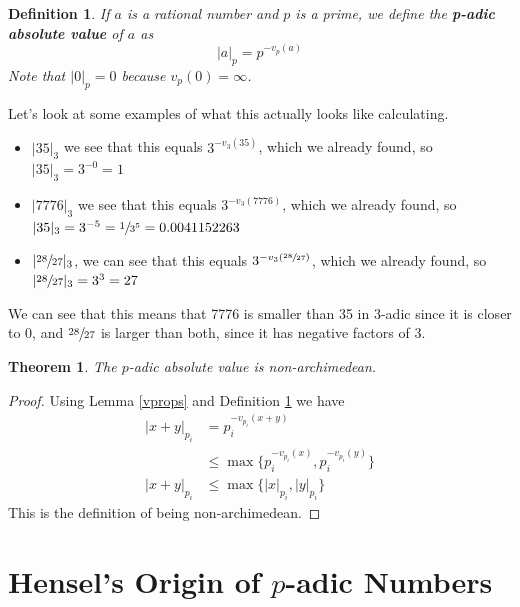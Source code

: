 \documentclass[11pt]{article}
\newtheorem{theorem}{Theorem}[section]
\newtheorem{definition}{Definition}[section]
\newcommand{\padic}{$p$-adic }
\newcommand{\bpadic}{p-adic }
\begin{document}
\begin{definition}\label{pabs}
  If $a$ is a rational number and $p$ is a prime, we define the \textbf{\bpadic absolute value} of $a$ as
  \[
    |a|_p = p^{-v_p(a)}
  \]
  Note that $|0|_p=0$ because $v_p(0)=\infty$.
\end{definition}

Let's look at some examples of what this actually looks like calculating.
\begin{itemize}
  \item $|35|_3$ we see that this equals $3^{-v_3(35)}$, which we already found, so $|35|_3=3^{-0}=1$
  \item $|7776|_3$ we see that this equals $3^{-v_3(7776)}$, which we already found, so $|35|_3=3^{-5}=\sfrac{1}{3^5}=0.0041152263$
  \item $|\sfrac{28}{27}|_3$, we can see that this equals $3^{-v_3(\sfrac{28}{27})}$, which we already found, so $|\sfrac{28}{27}|_3=3^{3}=27$
\end{itemize}
We can see that this means that 7776 is smaller than 35 in 3-adic since it is closer to 0, and $\sfrac{28}{27}$ is larger than both, since it has negative factors of 3.


\begin{theorem}\label{p-non-arch}
  The \padic absolute value is non-archimedean.
\end{theorem}

\begin{proof}
  Using Lemma \ref{vprops} and Definition \ref{pabs} we have
  \begin{align*}
    |x+y|_{p_i} & = p_i^{-v_{p_i}(x+y)}                             \\
                & \leq \max\{p_i^{-v_{p_i}(x)}, p_i^{-v_{p_i}(y)}\} \\
    |x+y|_{p_i} & \leq \max\{|x|_{p_i}, |y|_{p_i}\}
  \end{align*}
  This is the definition of being non-archimedean.
\end{proof}



\section{Hensel's Origin of \padic Numbers}
\end{document}
